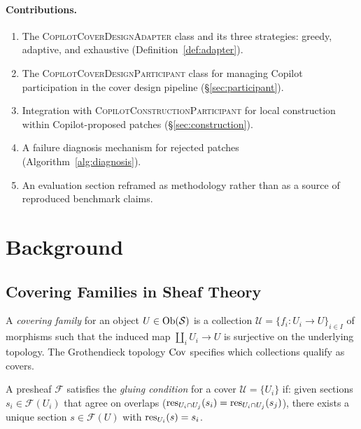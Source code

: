 \documentclass[11pt]{article}
\newcommand{\CovAdapt}{\textsc{CopilotCoverDesignAdapter}}
\newcommand{\CovPart}{\textsc{CopilotCoverDesignParticipant}}
\newcommand{\ConstrPart}{\textsc{CopilotConstructionParticipant}}
\newcommand{\covfam}{\mathcal{U}}
\begin{document}
\paragraph{Contributions.}
\begin{enumerate}[leftmargin=2em]
  \item The \CovAdapt{} class and its three strategies: greedy, adaptive, and
        exhaustive (Definition~\ref{def:adapter}).
  \item The \CovPart{} class for managing Copilot participation in the cover
        design pipeline (§\ref{sec:participant}).
  \item Integration with \ConstrPart{} for local construction within
        Copilot-proposed patches (§\ref{sec:construction}).
  \item A failure diagnosis mechanism for rejected patches
        (Algorithm~\ref{alg:diagnosis}).
  \item An evaluation section reframed as methodology rather than as a
        source of reproduced benchmark claims.
\end{enumerate}

\section{Background}\label{sec:bg}

\subsection{Covering Families in Sheaf Theory}

\begin{definition}\label{def:covering}
A \emph{covering family} for an object $U \in \mathrm{Ob}(\mathcal{S})$ is a collection
$\covfam = \{f_i: U_i \to U\}_{i \in I}$ of morphisms such that the
induced map $\coprod_i U_i \to U$ is surjective on the underlying topology.
The Grothendieck topology $\mathrm{Cov}$ specifies which collections qualify as covers.
\end{definition}

\begin{definition}\label{def:gluing}
A presheaf $\mathcal{F}$ satisfies the \emph{gluing condition} for a cover
$\covfam = \{U_i\}$ if: given sections $s_i \in \mathcal{F}(U_i)$ that agree
on overlaps ($\mathrm{res}_{U_i \cap U_j}(s_i) = \mathrm{res}_{U_i \cap U_j}(s_j)$), there
exists a unique section $s \in \mathcal{F}(U)$ with $\mathrm{res}_{U_i}(s) = s_i$.
\end{definition}
\end{document}
